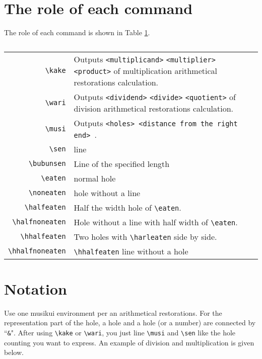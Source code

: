 \documentclass[dvipdfmx]{article}
\begin{document}
\section{The role of each command}
The role of each command is shown in Table \ref{yakuwari}.
\begin{longtable}[h]{rp{20em}}
\caption{\label{yakuwari}}\\
\verb|\kake|&Outputs \verb|<multiplicand>| \verb|<multiplier>| \verb|<product>| of multiplication arithmetical restorations calculation.\\
\verb|\wari|&Outputs \verb|<dividend>| \verb|<divide>| \verb|<quotient>| of division arithmetical restorations calculation.\\
\verb|\musi| &Outputs \verb|<holes> <distance from the right end> |.\\
\verb|\sen|&line\\
\verb|\bubunsen|&Line of the specified length\\
\verb|\eaten|&normal hole\\
\verb|\noneaten| &hole without a line \\
\verb|\halfeaten| &Half the width hole of \verb|\eaten|.\\
\verb|\halfnoneaten| &Hole without a line with half width of  \verb|\eaten|.\\
\verb|\hhalfeaten| &Two holes with \verb|\harleaten| side by side.\\
\verb|\hhalfnoneaten| &\verb|\hhalfeaten| line without a hole
\end{longtable}

\section{Notation}
Use one musikui environment per an arithmetical restorations.
For the representation part of the hole, a hole and a hole (or a number) are connected by  ``\verb|&|".
After using \verb|\kake| or \verb|\wari|, you just line \verb|\musi| and \verb|\sen| like the hole counting you want to express.
An example of division and multiplication is given below.
\end{document}
